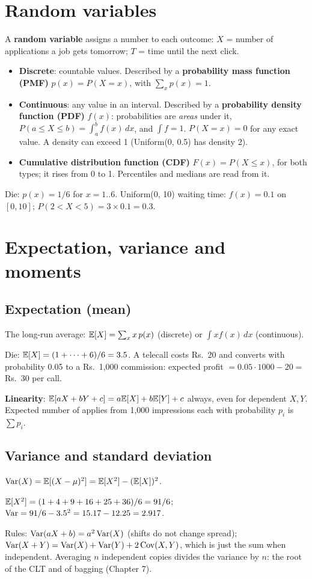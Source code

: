 \section{Random variables}
A \textbf{random variable} assigns a number to each outcome: $X$ = number of applications a job gets tomorrow; $T$ = time until the next click.
\begin{itemize}
\item \textbf{Discrete}: countable values. Described by a \textbf{probability mass function (PMF)} $p(x) = P(X = x)$, with $\sum_xp(x) = 1$.
\item \textbf{Continuous}: any value in an interval. Described by a \textbf{probability density function (PDF)} $f(x)$: probabilities are \emph{areas} under it,
  $P(a\le X\le b) = \int_a^bf(x)\,dx$, and $\int f = 1$. $P(X = x) = 0$ for any exact value. A density can exceed 1 (Uniform(0, 0.5) has density 2).
\item \textbf{Cumulative distribution function (CDF)} $F(x) = P(X\le x)$, for both types; it rises from 0 to 1. Percentiles and medians are read from it.
\end{itemize}
\begin{example}
Die: $p(x) = 1/6$ for $x = 1..6$. Uniform(0, 10) waiting time: $f(x) = 0.1$ on $[0,10]$; $P(2 < X < 5) = 3\times0.1 = 0.3$.
\end{example}

\section{Expectation, variance and moments}
\subsection{Expectation (mean)}
The long-run average: $\mathbb{E}[X] = \sum_xx\,p(x)$ (discrete) or $\int x f(x)\,dx$ (continuous).
\begin{example}[: expectations]
Die: $\mathbb{E}[X] = (1 + \dots + 6)/6 = 3.5$. A telecall costs Rs.~20 and converts with probability 0.05 to a Rs.~1{,}000 commission: expected profit $= 0.05\cdot1000 - 20 = $
Rs.~30 per call.
\end{example}
\textbf{Linearity}: $\mathbb{E}[aX + bY + c] = a\mathbb{E}[X] + b\mathbb{E}[Y] + c$ always, even for dependent $X, Y$. Expected number of applies from 1{,}000 impressions each with probability $p_i$
is $\sum p_i$.

\subsection{Variance and standard deviation}
$\operatorname{Var}(X) = \mathbb{E}[(X - \mu)^2] = \mathbb{E}[X^2] - (\mathbb{E}[X])^2$.
\begin{example}
$\mathbb{E}[X^2] = (1 + 4 + 9 + 16 + 25 + 36)/6 = 91/6$; $\operatorname{Var} = 91/6 - 3.5^2 = 15.17 - 12.25 = 2.917$.
\end{example}
Rules: $\operatorname{Var}(aX + b) = a^2\operatorname{Var}(X)$ (shifts do not change spread); $\operatorname{Var}(X + Y) = \operatorname{Var}(X) + \operatorname{Var}(Y) + 2\operatorname{Cov}(X, Y)$, which is just the sum when independent. Averaging $n$
independent copies divides the variance by $n$: the root of the CLT and of bagging (Chapter 7).

